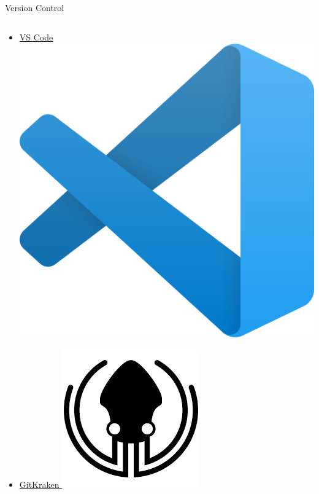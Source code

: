 \documentclass{beamer} %
\begin{document}
\begin{frame}{Version Control}
\begin{columns}
\begin{column}{0.5\textwidth}
\begin{itemize}
          \item \href{https://code.visualstudio.com/}{VS Code \includegraphics[height=.05\textheight]{vscode}}
          \item \href{https://www.gitkraken.com/}{GitKraken \includegraphics[height=.05\textheight]{gitkraken}}

\end{itemize}
\end{column}
\end{columns}
\end{frame}
\end{document}
